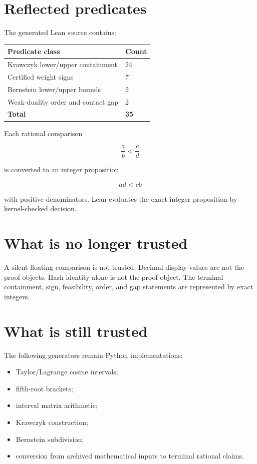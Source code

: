 \documentclass[11pt,a4paper,openany]{report}
\begin{document}
\section{Reflected predicates}

The generated Lean source contains:

\begin{center}
\begingroup\small
\setlength{\tabcolsep}{2.5pt}
\renewcommand{\arraystretch}{1.16}
\begin{longtable}{@{}p{}p{}@{}}
\toprule
\textbf{Predicate class} & \textbf{Count} \\
\midrule
\endhead
Krawczyk lower/\allowbreak{}upper containment & 24 \\
Certified weight signs & 7 \\
Bernstein lower/\allowbreak{}upper bounds & 2 \\
Weak-duality order and contact gap & 2 \\
\textbf{Total} & \textbf{35} \\
\bottomrule
\end{longtable}
\endgroup
\end{center}

Each rational comparison

\[
\frac ab<\frac cd
\]

is converted to an integer proposition

\[
ad<cb
\]

with positive denominators. Lean evaluates the exact integer proposition by kernel-checked decision.

\section{What is no longer trusted}

A silent floating comparison is not trusted. Decimal display values are not the proof objects. Hash identity alone is not the proof object. The terminal containment, sign, feasibility, order, and gap statements are represented by exact integers.

\section{What is still trusted}

The following generators remain Python implementations:

\begin{itemize}
\item 
Taylor/\allowbreak{}Lagrange cosine intervals;

\item 
fifth-root brackets;

\item 
interval matrix arithmetic;

\item 
Krawczyk construction;

\item 
Bernstein subdivision;

\item 
conversion from archived mathematical inputs to terminal rational claims.

\end{itemize}
\end{document}
